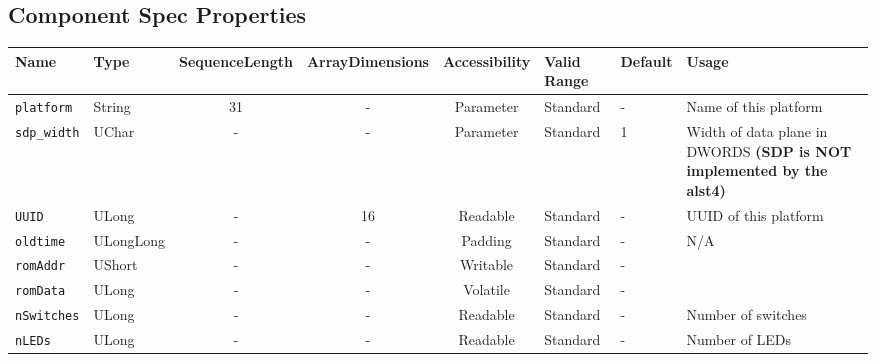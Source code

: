 \begin{landscape}
	\section*{Component Spec Properties}
	\begin{scriptsize}
		\begin{tabular}{|p{3cm}|p{1.5cm}|c|c|c|p{1.5cm}|p{1cm}|p{6cm}|}
			\hline
			\rowcolor{blue}
			Name               & Type   & SequenceLength & ArrayDimensions & Accessibility      & Valid Range & Default & Usage                                                                         \\
			\hline
			\verb+platform+    & String & 31             & -               & Parameter & Standard & - & Name of this platform                                                     \\
			\hline
			\verb+sdp_width+   & UChar  & -              & -               & Parameter & Standard & 1 & Width of data plane in DWORDS \newline \textbf{(SDP is NOT implemented by the alst4)} \\
			\hline
			\verb+UUID+        & ULong  & -              & 16              & Readable           & Standard    & -       & UUID of this platform                                                         \\
			\hline
			\verb+oldtime+     & ULongLong & -           & -               & Padding            & Standard    & -       & N/A                                                                           \\
			\hline
			\verb+romAddr+     & UShort & -              & -               & Writable           & Standard    & -       &                                                                               \\
			\hline
			\verb+romData+     & ULong  & -              & -               & Volatile           & Standard    & -       &                                                                               \\
			\hline
			\verb+nSwitches+   & ULong  & -              & -               & Readable           & Standard    & -       & Number of switches                                                            \\
			\hline
			\verb+nLEDs+       & ULong  & -              & -               & Readable           & Standard    & -       & Number of LEDs                                                                \\

\end{tabular}
\end{scriptsize}
\end{landscape}
